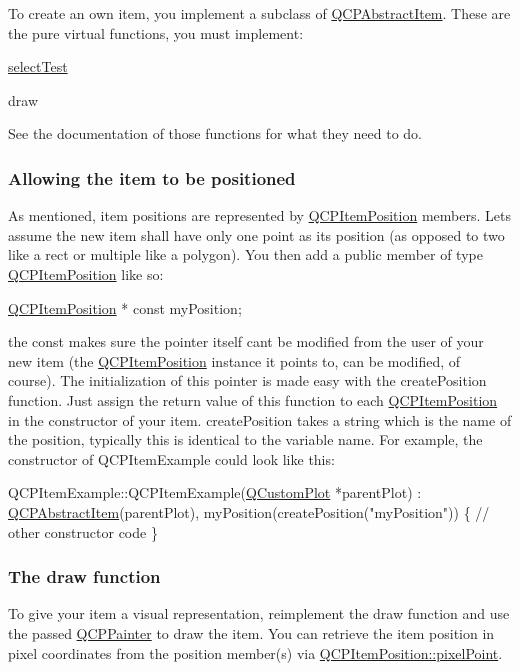 To create an own item, you implement a subclass of \hyperlink{classQCPAbstractItem}{Q\+C\+P\+Abstract\+Item}. These are the pure virtual functions, you must implement\+: \begin{DoxyItemize}
\item \hyperlink{classQCPAbstractItem_a96d522d10ffc0413b9a366c6f7f0476b}{select\+Test} \item draw\end{DoxyItemize}
See the documentation of those functions for what they need to do.\hypertarget{classQCPAbstractItem_items-positioning}{}\subsubsection{Allowing the item to be positioned}\label{classQCPAbstractItem_items-positioning}
As mentioned, item positions are represented by \hyperlink{classQCPItemPosition}{Q\+C\+P\+Item\+Position} members. Let\textquotesingle{}s assume the new item shall have only one point as its position (as opposed to two like a rect or multiple like a polygon). You then add a public member of type \hyperlink{classQCPItemPosition}{Q\+C\+P\+Item\+Position} like so\+:


\begin{DoxyCode}
\hyperlink{classQCPItemPosition}{QCPItemPosition} * \textcolor{keyword}{const} myPosition;
\end{DoxyCode}


the const makes sure the pointer itself can\textquotesingle{}t be modified from the user of your new item (the \hyperlink{classQCPItemPosition}{Q\+C\+P\+Item\+Position} instance it points to, can be modified, of course). The initialization of this pointer is made easy with the create\+Position function. Just assign the return value of this function to each \hyperlink{classQCPItemPosition}{Q\+C\+P\+Item\+Position} in the constructor of your item. create\+Position takes a string which is the name of the position, typically this is identical to the variable name. For example, the constructor of Q\+C\+P\+Item\+Example could look like this\+:


\begin{DoxyCode}
QCPItemExample::QCPItemExample(\hyperlink{classQCustomPlot}{QCustomPlot} *parentPlot) :
  \hyperlink{classQCPAbstractItem}{QCPAbstractItem}(parentPlot),
  myPosition(createPosition(\textcolor{stringliteral}{"myPosition"}))
\{
  \textcolor{comment}{// other constructor code}
\}
\end{DoxyCode}
\hypertarget{classQCPAbstractItem_items-drawing}{}\subsubsection{The draw function}\label{classQCPAbstractItem_items-drawing}
To give your item a visual representation, reimplement the draw function and use the passed \hyperlink{classQCPPainter}{Q\+C\+P\+Painter} to draw the item. You can retrieve the item position in pixel coordinates from the position member(s) via \hyperlink{classQCPItemPosition_ae490f9c76ee2ba33752c495d3b6e8fb5}{Q\+C\+P\+Item\+Position\+::pixel\+Point}.


